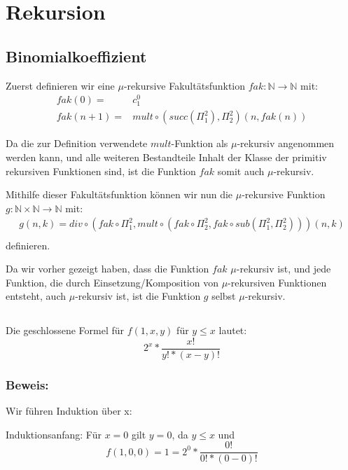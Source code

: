 \documentclass[10pt,leqno ]{article}
\begin{document}
\section{Rekursion}
\subsection{Binomialkoeffizient}
Zuerst definieren wir eine $\mu$-rekursive Fakultätsfunktion $fak: \mathbb{N} \rightarrow \mathbb{N}$ mit:
\begin{align*}
    fak(0) =& c^0_1 \\
    fak(n+1) =& mult \circ (succ(\Pi^2_1), \Pi^2_2)(n, fak(n))
\end{align*}

Da die zur Definition verwendete $mult$-Funktion als $\mu$-rekursiv angenommen werden kann, und alle weiteren Bestandteile Inhalt der Klasse der primitiv rekursiven Funktionen sind, ist die Funktion $fak$ somit auch $\mu$-rekursiv.

Mithilfe dieser Fakultätsfunktion können wir nun die $\mu$-rekursive Funktion $g: \mathbb{N} \times \mathbb{N} \rightarrow \mathbb{N}$ mit: 
\begin{align*}
    g(n,k) = div \circ (fak \circ \Pi^2_1, mult \circ (fak \circ \Pi^2_2, fak \circ sub(\Pi^2_1, \Pi^2_2))) (n,k) \\
\end{align*}
definieren.

Da wir vorher gezeigt haben, dass die Funktion $fak$ $\mu$-rekursiv ist, und jede Funktion, die durch Einsetzung/Komposition von $\mu$-rekursiven Funktionen entsteht, auch $\mu$-rekursiv ist, ist die Funktion $g$ selbst $\mu$-rekursiv.


\subsection{}
Die geschlossene Formel für $f(1,x,y)$ für $y \le x$ lautet: 
\[ 2^x * \frac{x!}{y! * (x - y)!} \]

\subsubsection*{Beweis:}
\begin{flushleft}
    Wir führen Induktion über x:
\end{flushleft}

Induktionsanfang:
Für $x = 0$ gilt $y = 0$, da $y \le x$ und 
\begin{equation*}
f(1,0,0) = 1 = 2^0 * \frac{0!}{0! * (0-0)!}
\end{equation*}
\end{document}

